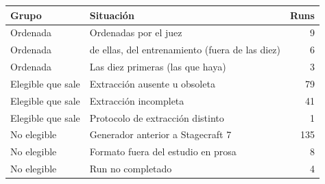 \begin{tabular}{@{}llr@{}}
\toprule
Grupo & Situación & Runs \\
\midrule
Ordenada & Ordenadas por el juez & 9 \\
Ordenada & de ellas, del entrenamiento (fuera de las diez) & 6 \\
Ordenada & Las diez primeras (las que haya) & 3 \\
Elegible que sale & Extracción ausente u obsoleta & 79 \\
Elegible que sale & Extracción incompleta & 41 \\
Elegible que sale & Protocolo de extracción distinto & 1 \\
No elegible & Generador anterior a Stagecraft 7 & 135 \\
No elegible & Formato fuera del estudio en prosa & 8 \\
No elegible & Run no completado & 4 \\
\bottomrule
\end{tabular}
